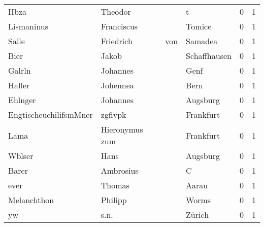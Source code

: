 \begin{tabular}{llllrr}
                     Hbza &                            Theodor &             &                                           t &          0 &         1 \\
               Lismaninus &                         Franciscus &             &                                      Tomice &          0 &         1 \\
                    Salle &                          Friedrich &         von &                                     Samadea &          0 &         1 \\
                     Bier &                              Jakob &             &                                Schaffhausen &          0 &         1 \\
                   Galrln &                           Johannes &             &                                        Genf &          0 &         1 \\
                   Haller &                           Johennea &             &                                        Bern &          0 &         1 \\
                  Ehlnger &                           Johannes &             &                                    Augsburg &          0 &         1 \\
   EngtischeuchilifsmMner &                            zgfivpk &             &                                   Frankfurt &          0 &         1 \\
                     Lama &                     Hieronymus zum &             &                                   Frankfurt &          0 &         1 \\
                   Wblser &                               Hans &             &                                    Augsburg &          0 &         1 \\
                    Barer &                          Ambrosius &             &                                           C &          0 &         1 \\
                     ever &                             Thomas &             &                                       Aarau &          0 &         1 \\
              Melanchthon &                            Philipp &             &                                       Worms &          0 &         1 \\
                       yw &                               s.n. &             &                                      Zürich &          0 &         1 \\

\end{tabular}

